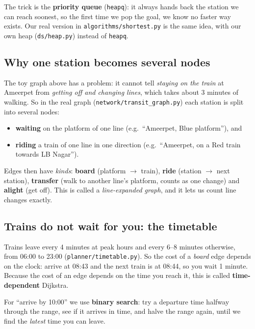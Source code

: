 \documentclass[11pt,a4paper]{article}
\newcommand{\file}[1]{\texttt{\color{accent}#1}}
\begin{document}
The trick is the \textbf{priority queue} (\texttt{heapq}): it always hands back the
station we can reach soonest, so the first time we pop the goal, we know no faster way exists.
Our real version in \file{algorithms/shortest.py} is the same idea, with our own heap
(\file{ds/heap.py}) instead of \texttt{heapq}.

\subsection{Why one station becomes several nodes}

The toy graph above has a problem: it cannot tell \emph{staying on the train} at Ameerpet
from \emph{getting off and changing lines}, which takes about 3 minutes of walking. So in
the real graph (\file{network/transit\_graph.py}) each station is split into several nodes:

\begin{itemize}
  \item \textbf{waiting} on the platform of one line (e.g.\ ``Ameerpet, Blue platform''), and
  \item \textbf{riding} a train of one line in one direction (e.g.\ ``Ameerpet, on a Red train towards LB Nagar'').
\end{itemize}

Edges then have \emph{kinds}: \textbf{board} (platform $\rightarrow$ train),
\textbf{ride} (station $\rightarrow$ next station), \textbf{transfer} (walk to another
line's platform, counts as one change) and \textbf{alight} (get off). This is called a
\emph{line-expanded graph}, and it lets us count line changes exactly.

\subsection{Trains do not wait for you: the timetable}

Trains leave every 4 minutes at peak hours and every 6--8 minutes otherwise, from 06:00 to
23:00 (\file{planner/timetable.py}). So the cost of a \emph{board} edge depends on the
clock: arrive at 08:43 and the next train is at 08:44, so you wait 1 minute. Because the cost
of an edge depends on the time you reach it, this is called \textbf{time-dependent} Dijkstra.

For ``arrive by 10:00'' we use \textbf{binary search}: try a departure time halfway through
the range, see if it arrives in time, and halve the range again, until we find the
\emph{latest} time you can leave.
\end{document}
